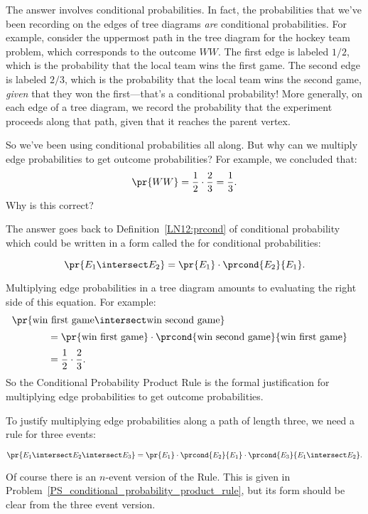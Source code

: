 The answer involves conditional probabilities.  In fact, the
probabilities that we've been recording on the edges of tree diagrams
\emph{are} conditional probabilities.  For example, consider the
uppermost path in the tree diagram for the hockey team problem, which
corresponds to the outcome $WW$.  The first edge is labeled $1/2$,
which is the probability that the local team wins the first game.  The
second edge is labeled $2 / 3$, which is the probability that the
local team wins the second game, \emph{given} that they won the
first---that's a conditional probability!  More generally, on each
edge of a tree diagram, we record the probability that the experiment
proceeds along that path, given that it reaches the parent vertex.

So we've been using conditional probabilities all along.  But why can
we multiply edge probabilities to get outcome probabilities?  For
example, we concluded that:
%
\begin{equation*}
\pr{WW} = \frac{1}{2} \cdot \frac{2}{3}
	= \frac{1}{3}.
\end{equation*}
%
Why is this correct?

The answer goes back to Definition~\ref{LN12:prcond} of conditional probability
which could be written in a form called the  for
conditional probabilities:
%
\begin{rul*}
%
\[
    \pr{E_1 \intersect E_2} = \pr{E_1} \cdot \prcond{E_2}{E_1}.
\]
\end{rul*}
Multiplying edge probabilities in a tree diagram amounts to evaluating
the right side of this equation.  For example:
\begin{align*}
\lefteqn{\pr{\text{win first game} \intersect \text{win second game}}}
		\hspace{0.5in} \\[2pt]
	& = \pr{\text{win first game}} \cdot
            \prcond{\text{win second game}}{\text{win first game}} \\[2pt]
	& = \frac{1}{2} \cdot \frac{2}{3}.
\end{align*}
So the Conditional Probability Product Rule is the formal
justification for multiplying edge probabilities to get outcome
probabilities.

To justify multiplying edge probabilities along a path of length three, we need
a rule for three events:
\begin{rul*}
%
\[
    \pr{E_1 \intersect E_2 \intersect E_3} = \pr{E_1} \cdot
    \prcond{E_2}{E_1} \cdot
\prcond{E_3}{E_1 \intersect E_2}.
\]
\end{rul*}
Of course there is an $n$-event version of the Rule.  This is given in
Problem~\ref{PS_conditional_probability_product_rule}, but its form
should be clear from the three event version.

